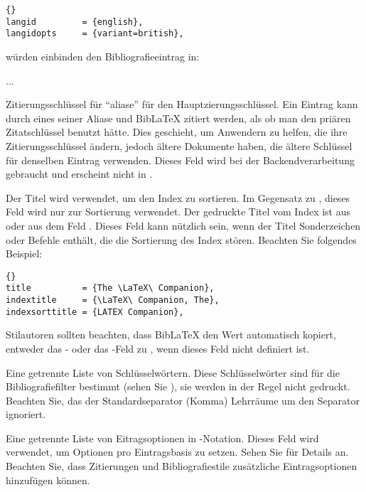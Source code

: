 \documentclass{ltxdockit}[2011/03/25]
\newcommand*{\biblatex}{BibLaTeX\xspace}
\begin{document}
\begin{fieldlist}
\begin{lstlisting}[style=bibtex]{}
langid         = {english},
langidopts     = {variant=british},
\end{lstlisting}
%
würden einbinden den Bibliografieeintrag in:

\begin{ltxexample}
\english[variant=british]
...
\endenglish
\end{ltxexample}
%


Zitierungsschlüssel für "`aliase"' für den Hauptzierungsschlüssel.
Ein Eintrag kann durch eines seiner Aliase und \biblatex zitiert werden, als
ob man den priären Zitatschlüssel benutzt hätte. Dies geschieht, um Anwendern zu helfen, die ihre Zitierungsschlüssel ändern, jedoch ältere Dokumente haben, die ältere Schlüssel für denselben Eintrag verwenden. Dieses Feld wird bei der Backendverarbeitung gebraucht und erscheint nicht in .


Der Titel wird verwendet, um den Index zu sortieren. Im Gegensatz zu , dieses Feld wird nur zur Sortierung verwendet.
Der gedruckte Titel vom Index ist aus  oder aus dem Feld  . Dieses Feld kann nützlich sein, wenn der Titel Sonderzeichen
oder Befehle enthält, die die Sortierung des Index stören. Beachten Sie folgendes Beispiel:

\begin{lstlisting}[style=bibtex]{}
title          = {The \LaTeX\ Companion},
indextitle     = {\LaTeX\ Companion, The},
indexsorttitle = {LATEX Companion},
\end{lstlisting}
%
Stilautoren sollten beachten, dass \biblatex den Wert automatisch kopiert, entweder das  - oder das -Feld zu  , wenn dieses Feld nicht definiert ist. 


Eine getrennte Liste von Schlüsselwörtern. Diese Schlüsselwörter sind für die Bibliografiefilter bestimmt (sehen Sie ), sie werden in der Regel nicht gedruckt. Beachten Sie, das der Standardseparator (Komma)
Lehrräume um den Separator ignoriert.


Eine getrennte Liste von Eitragsoptionen in \keyval-Notation. Dieses Feld
wird verwendet, um Optionen pro Eintragsbasis zu setzen. Sehen Sie für Details  an. Beachten Sie, dass Zitierungen und Bibliografiestile
zusätzliche Eintragsoptionen hinzufügen können.


\end{fieldlist}
\end{document}
